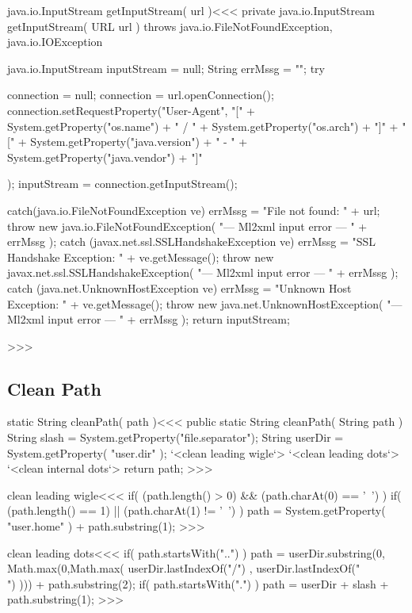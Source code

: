 \documentclass{article}
\begin{document}
\<java.io.InputStream getInputStream( url )\><<<
private java.io.InputStream getInputStream( URL url )
                            throws java.io.FileNotFoundException,
                                             java.io.IOException {
   java.io.InputStream inputStream = null;
   String errMssg = "";
   try{
      connection = null;
      connection = url.openConnection();
      connection.setRequestProperty("User-Agent",
                      "["
                    + System.getProperty("os.name")
                    + " / "
                    + System.getProperty("os.arch")
                    + "]"
                    + "["
                    + System.getProperty("java.version")
                    + " - "
                    + System.getProperty("java.vendor")
                    + "]"

           );
      inputStream = connection.getInputStream();
   } catch(java.io.FileNotFoundException ve){
      errMssg = "File not found: " + url;
      throw new java.io.FileNotFoundException(
                 "--- Ml2xml input error --- " + errMssg );
   } catch (javax.net.ssl.SSLHandshakeException ve){
      errMssg = "SSL Handshake Exception: " + ve.getMessage();
      throw new javax.net.ssl.SSLHandshakeException(
                 "--- Ml2xml input error --- " + errMssg );
   } catch (java.net.UnknownHostException ve){
      errMssg = "Unknown Host Exception: " + ve.getMessage();
      throw new java.net.UnknownHostException(
                   "--- Ml2xml input error --- " + errMssg );
   }
   return inputStream;
}
>>>



\subsection{Clean Path}



\<static String cleanPath( path )\><<<
public static String cleanPath( String path ){
     String slash = System.getProperty("file.separator");
     String userDir = System.getProperty( "user.dir" );
  `<clean leading wigle`>
  `<clean leading dots`>
  `<clean internal dots`>
  return path;
}
>>>

\<clean leading wigle\><<<
  if( (path.length() > 0) && (path.charAt(0) == '~') ){
    if( (path.length() == 1) || (path.charAt(1) != '~') ){
      path = System.getProperty( "user.home" )
                             + path.substring(1);
  } }
>>>

\<clean leading dots\><<<
  if( path.startsWith("..") ){
     path = userDir.substring(0,
               Math.max(0,Math.max(
                 userDir.lastIndexOf("/")
                 ,
                 userDir.lastIndexOf("\\")
               )))
            + path.substring(2);
  }
  if( path.startsWith(".") ){
     path = userDir + slash + path.substring(1);
  }
>>>
\end{document}
